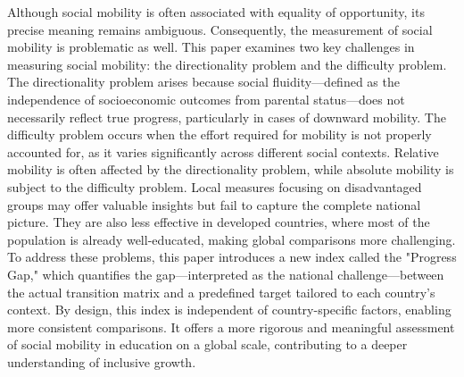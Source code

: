 Although social mobility is often associated with equality of opportunity, its precise meaning remains ambiguous. Consequently, the measurement of social mobility is problematic as well. This paper examines two key challenges in measuring social mobility: the directionality problem and the difficulty problem. The directionality problem arises because social fluidity---defined as the independence of socioeconomic outcomes from parental status---does not necessarily reflect true progress, particularly in cases of downward mobility. The difficulty problem occurs when the effort required for mobility is not properly accounted for, as it varies significantly across different social contexts. Relative mobility is often affected by the directionality problem, while absolute mobility is subject to the difficulty problem. Local measures focusing on disadvantaged groups may offer valuable insights but fail to capture the complete national picture. They are also less effective in developed countries, where most of the population is already well-educated, making global comparisons more challenging. To address these problems, this paper introduces a new index called the "Progress Gap," which quantifies the gap---interpreted as the national challenge---between the actual transition matrix and a predefined target tailored to each country's context. By design, this index is independent of country-specific factors, enabling more consistent comparisons. It offers a more rigorous and meaningful assessment of social mobility in education on a global scale, contributing to a deeper understanding of inclusive growth.